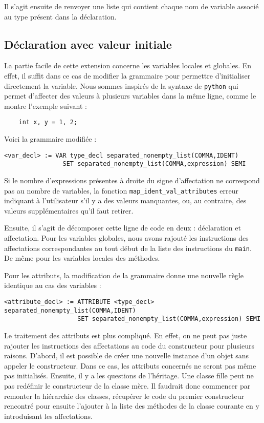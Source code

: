 \documentclass{article}
\begin{document}
Il s'agit ensuite de renvoyer une liste qui contient chaque nom de variable associé 
au type présent dans la déclaration.


\subsection{Déclaration avec valeur initiale}
La partie facile de cette extension concerne les variables locales et globales.
En effet, il suffit dans ce cas de modifier la grammaire pour permettre d'initialiser directement la variable.
Nous sommes inspirés de la syntaxe de \texttt{python} qui permet d'affecter des valeurs 
à plusieurs variables dans la même ligne, comme le montre l'exemple suivant : 
\begin{verbatim}
    int x, y = 1, 2;
\end{verbatim}
Voici la grammaire modifiée : 
\begin{lstlisting}[style=mystyle]
    <var_decl> := VAR type_decl separated_nonempty_list(COMMA,IDENT) 
                SET separated_nonempty_list(COMMA,expression) SEMI
\end{lstlisting}
Si le nombre d'expressions présentes à droite du signe d'affectation ne 
correspond pas au nombre de variables, la fonction \texttt{map\_ident\_val\_attributes} 
erreur indiquant à l'utilisateur 
s'il y a des valeurs manquantes, ou, 
au contraire, des valeurs supplémentaires qu'il faut retirer.


Ensuite, il s'agit de décomposer cette ligne de code en deux : déclaration et affectation. 
Pour les variables globales, nous avons rajouté les instructions des affectations correspondantes 
au tout début de la liste des instructions du \texttt{main}. 
De même pour les variables locales des méthodes.

\bigbreak
Pour les attributs, la modification de la grammaire donne une
nouvelle règle identique au cas des variables :
\begin{lstlisting}[style=mystyle]
    <attribute_decl> := ATTRIBUTE <type_decl> separated_nonempty_list(COMMA,IDENT) 
                    SET separated_nonempty_list(COMMA,expression) SEMI
\end{lstlisting}

Le traitement des attributs est plus compliqué.
En effet, on ne peut pas juste rajouter les instructions des affectations au code du constructeur pour 
plusieurs raisons. D'abord, il est possible de créer une nouvelle 
instance d'un objet sans appeler le constructeur. Dans ce cas, les attributs concernés
ne seront pas même pas initialisés. Ensuite, il y a les questions de l'héritage.
Une classe fille peut ne pas redéfinir le constructeur de la classe mère. Il faudrait donc commencer 
par remonter la hiérarchie des classes, récupérer le code du premier constructeur rencontré pour ensuite
l'ajouter à la liste des méthodes de la classe courante en y introduisant les affectations.
\end{document}
